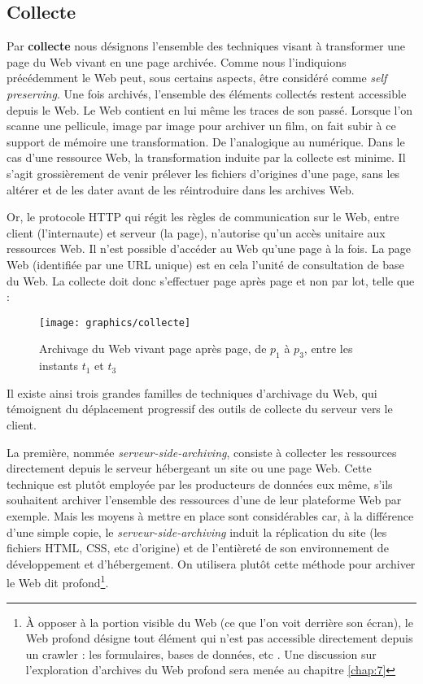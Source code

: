 \documentclass[symmetric,justified,marginals=raggedouter]{tufte-book}
\begin{document}
\subsection{Collecte}

\noindent Par \textbf{collecte} nous désignons l'ensemble des techniques visant à transformer une page du Web vivant en une page archivée. Comme nous l'indiquions précédemment le Web peut, sous certains aspects, être considéré comme \textit{self preserving}. Une fois archivés, l'ensemble des éléments collectés restent accessible depuis le Web. Le Web contient en lui même les traces de son passé. Lorsque l'on scanne une pellicule, image par image pour archiver un film, on fait subir à ce support de mémoire une transformation. De l'analogique au numérique. Dans le cas d'une ressource Web, la transformation induite par la collecte est minime. Il s'agit grossièrement de venir prélever les fichiers d'origines d'une page, sans les altérer et de les dater avant de les réintroduire dans les archives Web.     

Or, le protocole HTTP qui régit les règles de communication sur le Web, entre client (l'internaute) et serveur (la page), n'autorise qu'un accès unitaire aux ressources Web. Il n'est possible d'accéder au Web qu'une page à la fois. La page Web (identifiée par une URL unique) est en cela l'unité de consultation de base du Web. La collecte doit donc s'effectuer page après page et non par lot, telle que :   

\begin{figure*}%
  \texttt{[image: graphics/collecte]}
  \caption{Archivage du Web vivant page après page, de $p_1$ à $p_3$, entre les instants $t_1$ et $t_3$}
  \label{fig:collecte}
\end{figure*} 

\noindent Il existe ainsi trois grandes familles de techniques d'archivage du Web, qui témoignent du déplacement progressif des outils de collecte du serveur vers le client. 

La première, nommée \textit{serveur-side-archiving}, consiste à collecter les ressources directement depuis le serveur hébergeant un site ou une page Web. Cette technique est plutôt employée par les producteurs de données eux même, s'ils souhaitent archiver l'ensemble des ressources d'une de leur plateforme Web par exemple. Mais les moyens à mettre en place sont considérables car, à la différence d'une simple copie, le \textit{serveur-side-archiving} induit la réplication du site (les fichiers HTML, CSS, etc d'origine) et de l'entièreté de son environnement de dévelop\-pement et d'hébergement. On utilisera plutôt cette méthode pour archiver le Web dit profond\footnote{À opposer à la portion visible du Web (ce que l'on voit derrière son écran), le Web profond désigne tout élément qui n'est pas accessible directement depuis un crawler : les formulaires, bases de données, etc \citep{lawrence_accessibility_2000}. Une discussion sur l'exploration d'archives du Web profond sera menée au chapitre \ref{chap:7}}.
\end{document}
